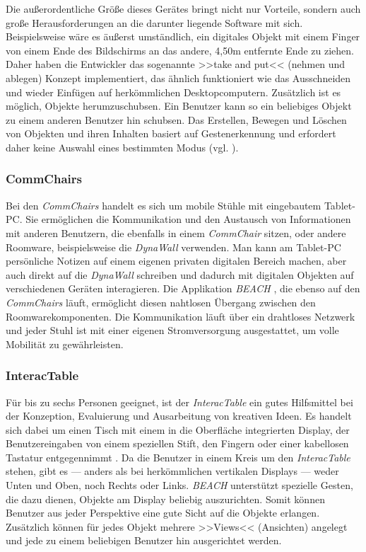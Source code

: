 Die außerordentliche Größe dieses Gerätes bringt nicht nur Vorteile, sondern auch große Herausforderungen an die darunter liegende Software mit sich. Beispielsweise wäre es äußerst umständlich, ein digitales Objekt mit einem Finger von einem Ende des Bildschirms an das andere, 4,50m entfernte Ende zu ziehen. Daher haben die Entwickler das sogenannte >>take and put<< (nehmen und ablegen) Konzept implementiert, das ähnlich funktioniert wie das Ausschneiden und wieder Einfügen auf herkömmlichen Desktopcomputern. Zusätzlich ist es möglich, Objekte herumzuschubsen. Ein Benutzer kann so ein beliebiges Objekt zu einem anderen Benutzer hin schubsen. Das Erstellen, Bewegen und Löschen von Objekten und ihren Inhalten basiert auf Gestenerkennung und erfordert daher keine Auswahl eines bestimmten Modus (vgl. ).

\subsubsection{CommChairs} 

Bei den \emph{CommChairs} handelt es sich um mobile Stühle mit eingebautem Tablet-PC. Sie ermöglichen die Kommunikation und den Austausch von Informationen mit anderen Benutzern, die ebenfalls in einem \emph{CommChair} sitzen, oder andere Roomware, beispielsweise die \emph{DynaWall} verwenden. Man kann am Tablet-PC persönliche Notizen auf einem eigenen privaten digitalen Bereich machen, aber auch direkt auf die \emph{DynaWall} schreiben und dadurch mit digitalen Objekten auf verschiedenen Geräten interagieren. Die Applikation \emph{BEACH} \citep{Tandler:2000p238}, die ebenso auf den \emph{CommChairs} läuft, ermöglicht diesen nahtlosen Übergang zwischen den Roomwarekomponenten. Die Kommunikation läuft über ein drahtloses Netzwerk und jeder Stuhl ist mit einer eigenen Stromversorgung ausgestattet, um volle Mobilität zu gewährleisten.

\subsubsection{InteracTable} 

Für bis zu sechs Personen geeignet, ist der \emph{InteracTable} ein gutes Hilfsmittel bei der Konzeption, Evaluierung und Ausarbeitung von kreativen Ideen. Es handelt sich dabei um einen Tisch mit einem in die Oberfläche integrierten Display, der Benutzereingaben von einem speziellen Stift, den Fingern oder einer kabellosen Tastatur entgegennimmt \citep{Streitz:2001p213}. Da die Benutzer in einem Kreis um den \emph{InteracTable} stehen, gibt es — anders als bei herkömmlichen vertikalen Displays — weder Unten und Oben, noch Rechts oder Links. \emph{BEACH} unterstützt spezielle Gesten, die dazu dienen, Objekte am Display beliebig auszurichten. Somit können Benutzer aus jeder Perspektive eine gute Sicht auf die Objekte erlangen. Zusätzlich können für jedes Objekt mehrere >>Views<< (Ansichten) angelegt und jede zu einem beliebigen Benutzer hin ausgerichtet werden. 

